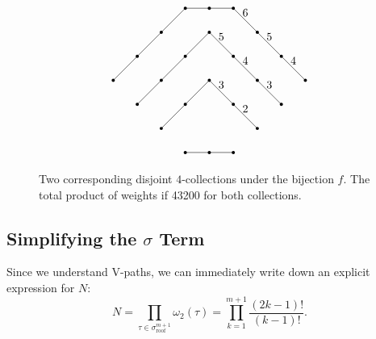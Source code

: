 \documentclass[11pt]{article}
\theoremstyle{mythm}
\begin{document}
\begin{figure}[h!]
\begin{equation*}
\begin{tikzpicture}[scale=0.75]
	\node at (3,1) [circle, fill, inner sep=1pt]{};
	\node at (4,1) [circle, fill, inner sep=1pt]{};
	\node at (5,1) [circle, fill, inner sep=1pt]{};
	\draw (3,1) -- (5,1);
	
	\node at (2,2) [circle, fill, inner sep=1pt]{};
	\node at (3,3) [circle, fill, inner sep=1pt]{};
	\node at (4,4) [circle, fill, inner sep=1pt]{};
	\node at (5,3) [circle, fill, inner sep=1pt]{};
	\node at (6,2) [circle, fill, inner sep=1pt]{};
	\draw (2,2) -- (3,3) -- (4,4);
	\draw (4,4) -- node[above] {3} (5,3);
	\draw (5,3) -- node[above] {2} (6,2);
	
	\node at (1,3) [circle, fill, inner sep=1pt]{};
	\node at (2,4) [circle, fill, inner sep=1pt]{};
	\node at (3,5) [circle, fill, inner sep=1pt]{};
	\node at (4,6) [circle, fill, inner sep=1pt]{};
	\node at (5,5) [circle, fill, inner sep=1pt]{};
	\node at (6,4) [circle, fill, inner sep=1pt]{};
	\node at (7,3) [circle, fill, inner sep=1pt]{};
	\draw (1,3) -- (2,4) -- (3,5) -- (4,6);
	\draw (4,6) -- node[above] {5} (5,5);
	\draw (5,5) -- node[above] {4} (6,4);
	\draw (6,4) -- node[above] {3} (7,3);
	
	\node at (0,4) [circle, fill, inner sep=1pt]{};
	\node at (1,5) [circle, fill, inner sep=1pt]{};
	\node at (2,6) [circle, fill, inner sep=1pt]{};
	\node at (3,7) [circle, fill, inner sep=1pt]{};
	\node at (4,7) [circle, fill, inner sep=1pt]{};
	\node at (5,7) [circle, fill, inner sep=1pt]{};
	\node at (6,6) [circle, fill, inner sep=1pt]{};
	\node at (7,5) [circle, fill, inner sep=1pt]{};
	\node at (8,4) [circle, fill, inner sep=1pt]{};
	\draw (0,4) -- (1,5) -- (2,6) -- (3,7) -- (4,7) -- (5,7);
	\draw (5,7) -- node[above] {6} (6,6);
	\draw (6,6) -- node[above] {5} (7,5);
	\draw (7,5) -- node[above] {4} (8,4);

\end{tikzpicture}
\end{equation*}
\caption{\label{fig:43200} Two corresponding disjoint $4$-collections under the bijection $f$. The total product of weights if 43200 for both collections.}
\end{figure}

\subsection{Simplifying the $\sigma$ Term}

Since we understand V-paths, we can immediately write down an explicit expression for $N$:
\begin{equation*}
N = \prod\limits_{\tau\in\sigma_{\text{roof}}^{m+1}}\omega_2(\tau) = \prod\limits_{k=1}^{m+1}\frac{(2k-1)!}{(k-1)!}.
\end{equation*}
\end{document}
